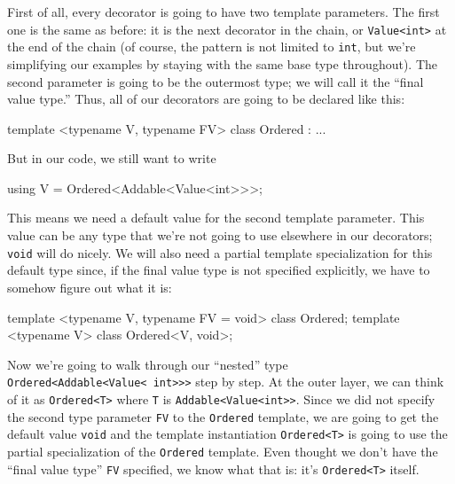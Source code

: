 First of all, every decorator is going to have two template parameters. The first one is the same as before: it is the next decorator in the chain, or \texttt{Value\textless{}int\textgreater{}} at the end of the chain (of course, the pattern is not limited to \texttt{int}, but we're simplifying our examples by staying with the same base type throughout). The second parameter is going to be the outermost type; we will call it the ``final value type.'' Thus, all of our decorators are going to be declared like this:

\begin{code}
template <typename V, typename FV> class Ordered : ...
\end{code}

But in our code, we still want to write

\begin{code}
using V = Ordered<Addable<Value<int>>>;
\end{code}

This means we need a default value for the second template parameter. This value can be any type that we're not going to use elsewhere in our decorators; \texttt{void} will do nicely. We will also need a partial template specialization for this default type since, if the final value type is not specified explicitly, we have to somehow figure out what it is:

\begin{code}
template <typename V, typename FV = void> class Ordered;
template <typename V> class Ordered<V, void>;
\end{code}

Now we're going to walk through our ``nested'' type \texttt{Ordered\textless{}Addable\textless{}Value\textless{}\ int\textgreater{}\textgreater{}\textgreater{}} step by step. At the outer layer, we can think of it as \texttt{Ordered\textless{}T\textgreater{}} where \texttt{T} is \texttt{Addable\textless{}Value\textless{}int\textgreater{}\textgreater{}}. Since we did not specify the second type parameter \texttt{FV} to the \texttt{Ordered} template, we are going to get the default value \texttt{void} and the template instantiation \texttt{Ordered\textless{}T\textgreater{}} is going to use the partial specialization of the \texttt{Ordered} template. Even thought we don't have the ``final value type'' \texttt{FV} specified, we know what that is: it's \texttt{Ordered\textless{}T\textgreater{}} itself.

